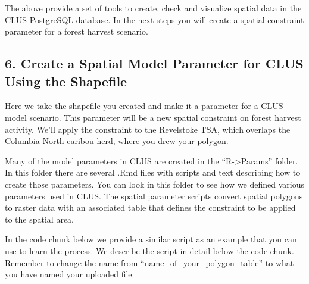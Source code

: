 \documentclass[
]{article}
\begin{document}
The above provide a set of tools to create, check and visualize spatial
data in the CLUS PostgreSQL database. In the next steps you will create
a spatial constraint parameter for a forest harvest scenario.

\hypertarget{create-a-spatial-model-parameter-for-clus-using-the-shapefile}{%
\subsection{6. Create a Spatial Model Parameter for CLUS Using the
Shapefile}\label{create-a-spatial-model-parameter-for-clus-using-the-shapefile}}

Here we take the shapefile you created and make it a parameter for a
CLUS model scenario. This parameter will be a new spatial constraint on
forest harvest activity. We'll apply the constraint to the Revelstoke
TSA, which overlaps the Columbia North caribou herd, where you drew your
polygon.

Many of the model parameters in CLUS are created in the
``R-\textgreater Params'' folder. In this folder there are several .Rmd
files with scripts and text describing how to create those parameters.
You can look in this folder to see how we defined various parameters
used in CLUS. The spatial parameter scripts convert spatial polygons to
raster data with an associated table that defines the constraint to be
applied to the spatial area.

In the code chunk below we provide a similar script as an example that
you can use to learn the process. We describe the script in detail below
the code chunk. Remember to change the name from
``name\_of\_your\_polygon\_table'' to what you have named your uploaded
file.
\end{document}

